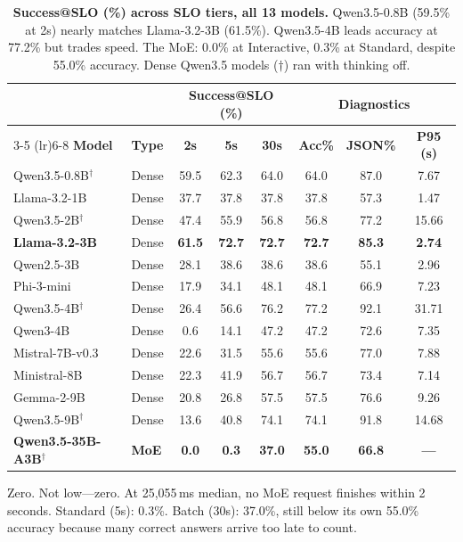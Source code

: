 \documentclass[11pt]{article}
\begin{document}
\begin{table}[t]
\centering
\caption{\textbf{Success@SLO (\%) across SLO tiers, all 13 models.} Qwen3.5-0.8B (59.5\% at 2s) nearly matches Llama-3.2-3B (61.5\%).  Qwen3.5-4B leads accuracy at 77.2\% but trades speed.  The MoE: 0.0\% at Interactive, 0.3\% at Standard, despite 55.0\% accuracy.  Dense Qwen3.5 models ($\dagger$) ran with thinking off.}
\label{tab:sslo-tiers}
\small
\begin{tabular}{ll ccc ccc}
\toprule
& & \multicolumn{3}{c}{\textbf{Success@SLO (\%)}} & \multicolumn{3}{c}{\textbf{Diagnostics}} \\
\cmidrule(lr){3-5} \cmidrule(lr){6-8}
\textbf{Model} & \textbf{Type} & \textbf{2s} & \textbf{5s} & \textbf{30s} & \textbf{Acc\%} & \textbf{JSON\%} & \textbf{P95 (s)} \\
\midrule
Qwen3.5-0.8B$^\dagger$ & Dense & 59.5 & 62.3 & 64.0 & 64.0 & 87.0 & 7.67 \\
Llama-3.2-1B & Dense & 37.7 & 37.8 & 37.8 & 37.8 & 57.3 & 1.47 \\
Qwen3.5-2B$^\dagger$ & Dense & 47.4 & 55.9 & 56.8 & 56.8 & 77.2 & 15.66 \\
\textbf{Llama-3.2-3B} & Dense & \textbf{61.5} & \textbf{72.7} & \textbf{72.7} & \textbf{72.7} & \textbf{85.3} & \textbf{2.74} \\
Qwen2.5-3B & Dense & 28.1 & 38.6 & 38.6 & 38.6 & 55.1 & 2.96 \\
Phi-3-mini & Dense & 17.9 & 34.1 & 48.1 & 48.1 & 66.9 & 7.23 \\
Qwen3.5-4B$^\dagger$ & Dense & 26.4 & 56.6 & 76.2 & 77.2 & 92.1 & 31.71 \\
Qwen3-4B & Dense & 0.6  & 14.1 & 47.2 & 47.2 & 72.6 & 7.35 \\
Mistral-7B-v0.3 & Dense & 22.6 & 31.5 & 55.6 & 55.6 & 77.0 & 7.88 \\
Ministral-8B & Dense & 22.3 & 41.9 & 56.7 & 56.7 & 73.4 & 7.14 \\
Gemma-2-9B & Dense & 20.8 & 26.8 & 57.5 & 57.5 & 76.6 & 9.26 \\
Qwen3.5-9B$^\dagger$ & Dense & 13.6 & 40.8 & 74.1 & 74.1 & 91.8 & 14.68 \\
\midrule
\rowcolor{moepurple!8}
\textbf{Qwen3.5-35B-A3B}$^\dagger$ & \textbf{MoE} & \textbf{0.0} & \textbf{0.3} & \textbf{37.0} & \textbf{55.0} & \textbf{66.8} & \textbf{---} \\
\bottomrule
\end{tabular}
\end{table}

Zero.  Not low---zero.  At 25,055\,ms median, no MoE request finishes within 2 seconds.  Standard (5s): 0.3\%.  Batch (30s): 37.0\%, still below its own 55.0\% accuracy because many correct answers arrive too late to count.
\end{document}
